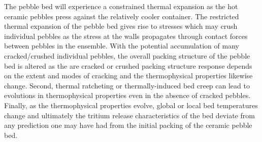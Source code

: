 The pebble bed will experience a constrained thermal expansion as the hot ceramic pebbles press against the relatively cooler container. The restricted thermal expansion of the pebble bed gives rise to stresses which may crush individual pebbles as the stress at the walls propagates through contact forces between pebbles in the ensemble. With the potential accumulation of many cracked/crushed individual pebbles, the overall packing structure of the pebble bed is altered as the  are cracked or crushed packing structure response depends on the extent and modes of cracking and the thermophysical properties likewise change. Second, thermal ratcheting or thermally-induced bed creep can lead to evolutions in thermophysical properties even in the absence of cracked pebbles. Finally, as the thermophysical properties evolve, global or local bed temperatures change and ultimately the tritium release characteristics of the bed deviate from any prediction one may have had from the initial packing of the ceramic pebble bed. 






